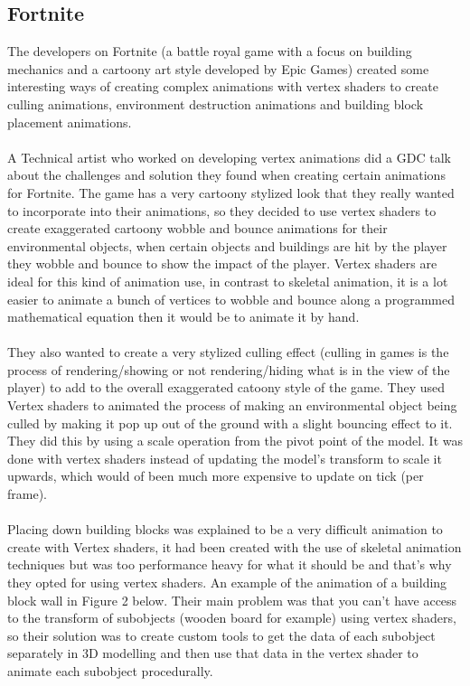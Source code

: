\documentclass{scrartcl}
\begin{document}
\subsection{Fortnite}
The developers on Fortnite (a battle royal game with a focus on building mechanics and a cartoony art style developed by Epic Games) created some interesting ways of creating complex animations with vertex shaders to create culling animations, environment destruction animations and building block placement animations.
\\~\\
A Technical artist who worked on developing vertex animations did a GDC talk about the challenges and solution they found when creating certain animations for Fortnite.\cite{thirteen} The game has a very cartoony stylized look that they really wanted to incorporate into their animations, so they decided to use vertex shaders to create exaggerated cartoony wobble and bounce animations for their environmental objects, when certain objects and buildings are hit by the player they wobble and bounce to show the impact of the player. Vertex shaders are ideal for this kind of animation use, in contrast to skeletal animation, it is a lot easier to animate a bunch of vertices to wobble and bounce along a programmed mathematical equation then it would be to animate it by hand.
\\~\\
They also wanted to create a very stylized culling effect (culling in games is the process of rendering/showing or not rendering/hiding what is in the view of the player) to add to the overall exaggerated catoony style of the game. They used Vertex shaders to animated the process of making an environmental object being culled by making it pop up out of the ground with a slight bouncing effect to it. They did this by using a scale operation from the pivot point of the model. It was done with vertex shaders instead of updating the model's transform to scale it upwards, which would of been much more expensive to update on tick (per frame).
\\~\\
Placing down building blocks was explained to be a very difficult animation to create with Vertex shaders, it had been created with the use of skeletal animation techniques but was too performance heavy for what it should be and that's why they opted for using vertex shaders. An example of the animation of a building block wall in Figure 2 below. Their main problem was that you can't have access to the transform of subobjects (wooden board for example) using vertex shaders, so their solution was to create custom tools to get the data of each subobject separately in 3D modelling and then use that data in the vertex shader to animate each subobject procedurally.
\end{document}

